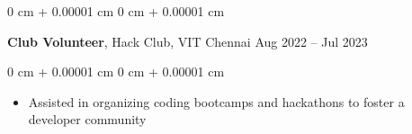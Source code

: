 \documentclass[10pt, letterpaper]{article}
\newenvironment{highlights}{
    \begin{itemize}[
        topsep=0.10 cm,
        parsep=0.10 cm,
        partopsep=0pt,
        itemsep=0pt,
        leftmargin=0 cm + 10pt
    ]
}{
    \end{itemize}
} %
\newenvironment{onecolentry}{
    \begin{adjustwidth}{
        0 cm + 0.00001 cm
    }{
        0 cm + 0.00001 cm
    }
}{
    \end{adjustwidth}
} %
\newenvironment{twocolentry}[2][]{
    \onecolentry
    \def\secondColumn{#2}
    \setcolumnwidth{\fill, 4.5 cm}
    \begin{paracol}{2}
}{
    \switchcolumn \raggedleft \secondColumn
    \end{paracol}
    \endonecolentry
} %
\begin{document}
        \begin{twocolentry}{
            Aug 2022 – Jul 2023 
        }
            \textbf{Club Volunteer}, Hack Club, VIT Chennai \end{twocolentry}

        \vspace{0.10 cm}
        \begin{onecolentry}
            \begin{highlights}
                \item Assisted in organizing coding bootcamps and hackathons to foster a developer community 
            \end{highlights}
        \end{onecolentry}
\end{document}
